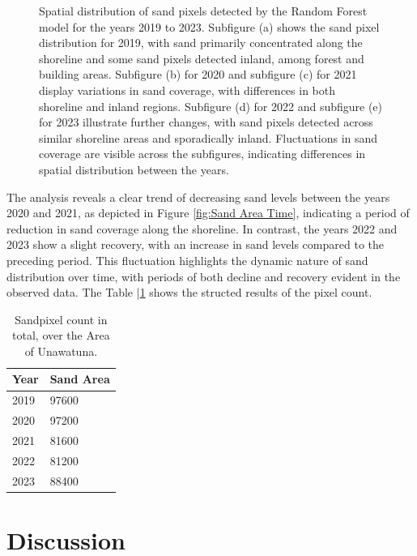 \documentclass[a4paper,12pt]{article}
\begin{document}
\begin{figure}[H]
    \caption[Spatial distribution of sand pixels detected by the Random Forest model for the years 2019 to 2023]{Spatial distribution of sand pixels detected by the Random Forest model for the years 2019 to 2023. Subfigure (a) shows the sand pixel distribution for 2019, with sand primarily concentrated along the shoreline and some sand pixels detected inland, among forest and building areas. Subfigure (b) for 2020 and subfigure (c) for 2021 display variations in sand coverage, with differences in both shoreline and inland regions. Subfigure (d) for 2022 and subfigure (e) for 2023 illustrate further changes, with sand pixels detected across similar shoreline areas and sporadically inland. Fluctuations in sand coverage are visible across the subfigures, indicating differences in spatial distribution between the years.}
    \label{fig:all_models_comparison}
\end{figure}
The analysis reveals a clear trend of decreasing sand levels between the years 2020 and 2021, as depicted in Figure \ref{fig:Sand Area Time}, indicating a period of reduction in sand coverage along the shoreline. In contrast, the years 2022 and 2023 show a slight recovery, with an increase in sand levels compared to the preceding period. This fluctuation highlights the dynamic nature of sand distribution over time, with periods of both decline and recovery evident in the observed data. The Table |\ref{fig:tab2} shows the structed results of the pixel count.

\begin{table}[h]
\centering
\begin{tabular}{|p{3cm}|p{8cm}|}
\hline
\textbf{Year} & \textbf{Sand Area} \\ \hline
2019 & 97600\\ \hline
2020 & 97200 \\ \hline
2021 & 81600 \\ \hline
2022 & 81200 \\ \hline
2023 & 88400 \\ \hline

\end{tabular}
\caption{Sandpixel count in total, over the Area of Unawatuna.}
\label{fig:tab2}
\end{table}


\newpage
\section{Discussion}
\end{document}
